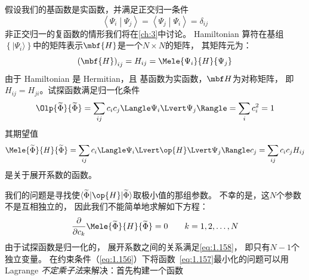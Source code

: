 假设我们的基函数是实函数，并满足正交归一条件
\begin{equation}
 \left\langle\Psi_i\middle\vert\Psi_j\right\rangle = \left\langle\Psi_j\middle\vert\Psi_i\right\rangle = \delta_{ij}
 \label{eq:1.154}
\end{equation}
非正交归一的复函数的情形我们将在\autoref{ch:3}中讨论。
Hamiltonian 算符在基组$\left\{\vert\Psi_i\rangle\right\}$中的矩阵表示$\mbf{H}$是一个$N\times N$的矩阵，
其矩阵元为：
\begin{equation}
 \left(\mbf{H}\right)_{ij} = H_{ij} = \Mele{\Psi_i}{H}{\Psi_j}
 \label{eq:1.155}
\end{equation}
由于 Hamiltonian 是 Hermitian，且
基函数为实函数，$\mbf H$为对称矩阵，
即$H_{ij} = H_{ji}$。试探函数满足归一化条件
\begin{equation}
 \Olp{\widetilde\Phi}{\widetilde\Phi} = \sum_{ij} c_i c_j \Langle\Psi_i\Lvert\Psi_j\Rangle = \sum_i c_i^2 = 1
 \label{eq:1.156}
\end{equation}
其期望值
\begin{equation}
 \Mele{\widetilde\Phi}{H}{\widetilde\Phi} = \sum_{ij}c_i\Langle\Psi_i\Lvert\op{H}\Lvert\Psi_j\Rangle c_j = \sum_{ij}c_ic_jH_{ij}
 \label{eq:1.157}
\end{equation}
是关于展开系数的函数。

我们的问题是寻找使$\langle\widetilde\Phi\vert\op{H}\vert\widetilde\Phi\rangle$取极小值的那组参数。
不幸的是，这$N$个参数不是互相独立的，
因此我们不能简单地求解如下方程：
\begin{equation}
 \frac{\partial}{\partial c_k} \Mele{\widetilde\Phi}{H}{\widetilde\Phi} = 0 \qquad k = 1, 2, \dots, N
 \label{eq:1.158}
\end{equation}
由于试探函数是归一化的，
展开系数之间的关系满足\autoref{eq:1.158}，
即只有$N-1$个独立变量。
在约束条件（\autoref{eq:1.156}）下将函数~\eqref{eq:1.157}最小化的问题可以用 Lagrange \emph{不定乘子法}来解决：首先构建一个函数

